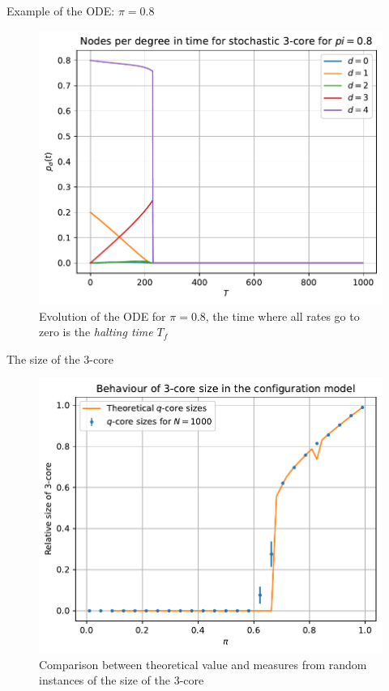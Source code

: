 \documentclass[handout]{beamer}
\begin{document}
\begin{frame}{Example of the ODE: $\pi=0.8$}
    \begin{figure}
        \centering
        \includegraphics[width=.6\textwidth]{ode_evol_pi08.pdf}
        \caption{Evolution of the ODE for $\pi=0.8$, the time where all rates
        go to zero is the \emph{halting time} $T_f$}
        \label{ref:ode_evol_pi03}
    \end{figure}
\end{frame}

\begin{frame}{The size of the 3-core}
    \begin{figure}
        \centering
        \includegraphics[height=.7\textheight]{qcore}
        \caption{Comparison between theoretical value and measures from random
        instances of the size of the 3-core}
        \label{fig:qcore}
    \end{figure}
\end{frame}
\end{document}
